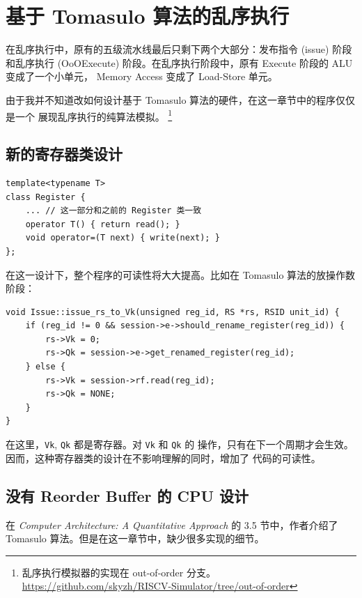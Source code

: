 \documentclass[12pt]{article}
\begin{document}
    \section{基于 Tomasulo 算法的乱序执行}\label{out_of_order_execution}

    在乱序执行中，原有的五级流水线最后只剩下两个大部分：发布指令 (issue) 阶段和乱序执行
    (OoOExecute) 阶段。在乱序执行阶段中，原有 Execute 阶段的 ALU 变成了一个小单元，
    Memory Access 变成了 Load-Store 单元。

    由于我并不知道改如何设计基于 Tomasulo 算法的硬件，在这一章节中的程序仅仅是一个
    展现乱序执行的纯算法模拟。
    \footnote{乱序执行模拟器的实现在 out-of-order 分支。
        \url{https://github.com/skyzh/RISCV-Simulator/tree/out-of-order}}

    \subsection{新的寄存器类设计}\label{new_register_design}

    \begin{verbatim}
template<typename T>
class Register {
    ... // 这一部分和之前的 Register 类一致
    operator T() { return read(); }
    void operator=(T next) { write(next); }
};
    \end{verbatim}

    在这一设计下，整个程序的可读性将大大提高。比如在 Tomasulo 算法的放操作数阶段：

    \begin{verbatim}
void Issue::issue_rs_to_Vk(unsigned reg_id, RS *rs, RSID unit_id) {
    if (reg_id != 0 && session->e->should_rename_register(reg_id)) {
        rs->Vk = 0;
        rs->Qk = session->e->get_renamed_register(reg_id);
    } else {
        rs->Vk = session->rf.read(reg_id);
        rs->Qk = NONE;
    }
}
    \end{verbatim}

    在这里，\texttt{Vk}, \texttt{Qk} 都是寄存器。对 \texttt{Vk} 和 \texttt{Qk} 的
    操作，只有在下一个周期才会生效。因而，这种寄存器类的设计在不影响理解的同时，增加了
    代码的可读性。

    \subsection{没有 Reorder Buffer 的 CPU 设计}

    在 \emph{Computer Architecture: A Quantitative Approach} 的 3.5 节中，作者介绍了
    Tomasulo 算法。但是在这一章节中，缺少很多实现的细节。
\end{document}
